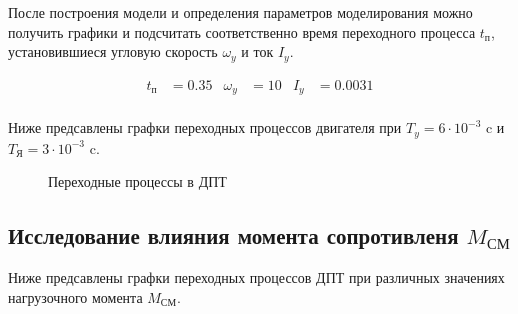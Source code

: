 \documentclass[a4paper, 12pt]{article}
\begin{document}
После построения модели и определения параметров моделирования можно получить графики и подсчитать соответственно время переходного процесса $t_\text{п}$, установившиеся угловую скорость $\omega_y$ и ток $I_y$.

\begin{align*}
    t_\text{п} & = 0.35 & \omega_y & = 10 & I_y & = 0.0031 \\
\end{align*}

Ниже предсавлены графки переходных процессов двигателя при $T_y = 6\cdot10^{-3}$ c и $T_\text{Я} = 3\cdot10^{-3}$ c.

\begin{figure}[h!]
    \centering
    \caption{Переходные процессы в ДПТ}
\end{figure}
\newpage
\begin{center}
\section{Исследование влияния момента сопротивленя $M_\text{СМ}$}
\end{center}
\par Ниже предсавлены графки переходных процессов ДПТ при различных значениях нагрузочного момента $M_\text{СМ}$.
\end{document}
